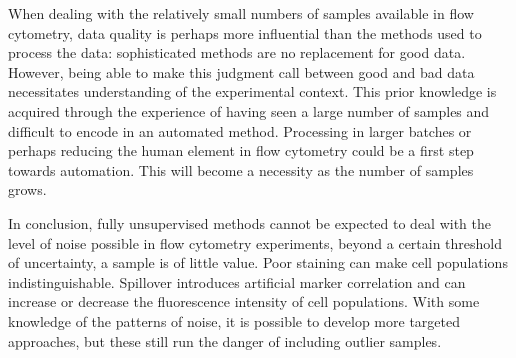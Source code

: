 
When dealing with the relatively small numbers of samples available in flow cytometry, data quality is perhaps more influential than the methods used to process the data: sophisticated methods are no replacement for good data.
However, being able to make this judgment call between good and bad data necessitates understanding of the experimental context.
This prior knowledge is acquired through the experience of having seen a large number of samples and difficult to encode in an automated method.
Processing in larger batches or perhaps reducing the human element in flow cytometry could be a first step towards automation.
This will become a necessity  as the number of samples grows.


In conclusion, fully unsupervised methods cannot be expected to deal with the level of noise possible in flow cytometry experiments, beyond a certain threshold of uncertainty, a sample is of little value.
Poor staining can make cell populations indistinguishable.
Spillover introduces artificial marker correlation and can increase or decrease the fluorescence intensity of cell populations.  
With some knowledge of the patterns of noise, it is possible to develop more targeted approaches,
but these still run the danger of including outlier samples.



